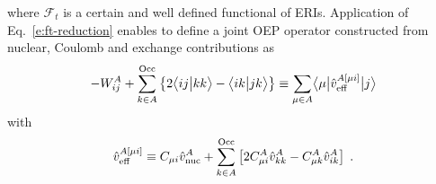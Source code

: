 %
where ${\mathcal{F}}_t$ is a certain and well defined functional of ERIs.
Application of Eq.~\eqref{e:ft-reduction} enables to define
a joint OEP
operator constructed from nuclear, Coulomb and exchange
contributions as
%
\begin{equation}
 -W^A_{ij} + 
 \sum_{k\in A}^{\rm Occ} 
  \left\{ 2\bigl\langle {ij} \bigl\lvert {kk} \bigr\rangle - \bigl\langle {ik} \bigl\lvert {jk} \bigr\rangle \right\}
\equiv \sum_{\mu\in A} \bigl\langle {\mu} \bigl\lvert { 
\hat{v}^{A[\mu i]}_{\rm eff}
 } \bigl\lvert {j} \bigr\rangle
\end{equation}
%
with
%
\begin{equation}
 \hat{v}^{A[\mu i]}_{\rm eff} \equiv C_{\mu i} \hat{v}^A_{\rm nuc} + 
 \sum_{k\in A}^{\rm Occ} \left[
 2C_{\mu i}^A \hat{v}^A_{kk} - C_{\mu k}^A \hat{v}^A_{ik}
 \right] \;.
\end{equation}
%
%
%
